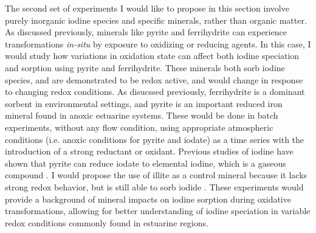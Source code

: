 \documentclass[twoside,12pt,titlepage]{article}
\begin{document}
\par The second set of experiments I would like to propose in this section involve purely inorganic iodine species and specific minerals, rather than organic matter. As discussed previously, minerals like pyrite and ferrihydrite can experience transformations \textit{in-situ} by exposure to oxidizing or reducing agents. In this case, I would study how variations in oxidation state can affect both iodine speciation and sorption using pyrite and ferrihydrite. These minerals both sorb iodine species, and are demonstrated to be redox active, and would change in response to changing redox conditions. As disucssed previously, ferrihydrite is a dominant sorbent in environmental settings, and pyrite is an important reduced iron mineral found in anoxic estuarine systems. These would be done in batch experiments, without any flow condition, using appropriate atmospheric conditions (i.e. anoxic conditions for pyrite and iodate) as a time series with the introduction of a strong reductant or oxidant. Previous studies of iodine have shown that pyrite can reduce iodate to elemental iodine, which is a gaseous compound \cite{Kaplan2014}.  I would propose the use of illite as a control mineral because it lacks strong redox behavior, but is still able to sorb iodide \cite{Kaplan2014}. These experiments would provide a background of mineral impacts on iodine sorption during oxidative transformations, allowing for better understanding of iodine speciation in variable redox conditions commonly found in estuarine regions.
\end{document}
